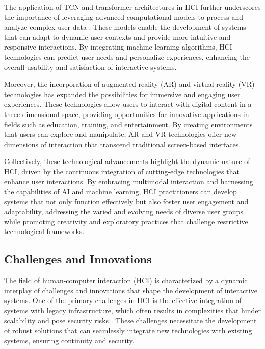 The application of TCN and transformer architectures in HCI further underscores the importance of leveraging advanced computational models to process and analyze complex user data \cite{zhou2023leveragingtcntransformereffective}. These models enable the development of systems that can adapt to dynamic user contexts and provide more intuitive and responsive interactions. By integrating machine learning algorithms, HCI technologies can predict user needs and personalize experiences, enhancing the overall usability and satisfaction of interactive systems.



Moreover, the incorporation of augmented reality (AR) and virtual reality (VR) technologies has expanded the possibilities for immersive and engaging user experiences. These technologies allow users to interact with digital content in a three-dimensional space, providing opportunities for innovative applications in fields such as education, training, and entertainment. By creating environments that users can explore and manipulate, AR and VR technologies offer new dimensions of interaction that transcend traditional screen-based interfaces.



Collectively, these technological advancements highlight the dynamic nature of HCI, driven by the continuous integration of cutting-edge technologies that enhance user interactions. By embracing multimodal interaction and harnessing the capabilities of AI and machine learning, HCI practitioners can develop systems that not only function effectively but also foster user engagement and adaptability, addressing the varied and evolving needs of diverse user groups while promoting creativity and exploratory practices that challenge restrictive technological frameworks. \cite{palmini2024patternscreativityuserinput}



\subsection{Challenges and Innovations} \label{subsec:Challenges and Innovations}

The field of human-computer interaction (HCI) is characterized by a dynamic interplay of challenges and innovations that shape the development of interactive systems. One of the primary challenges in HCI is the effective integration of systems with legacy infrastructure, which often results in complexities that hinder scalability and pose security risks \cite{pandy2024advancementsroboticsprocessautomation}. These challenges necessitate the development of robust solutions that can seamlessly integrate new technologies with existing systems, ensuring continuity and security.



